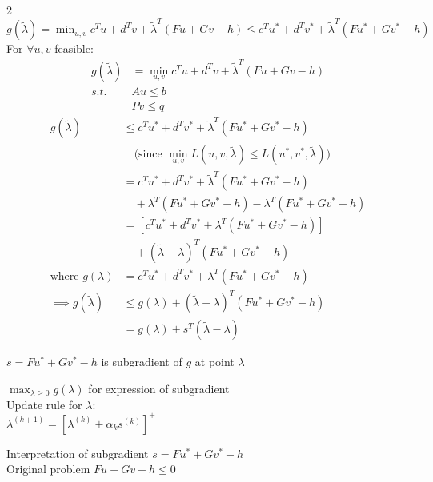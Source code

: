 \documentclass[8pt]{extarticle}
\begin{document}
\begin{multicols*}{2}
  $g(\tilde{\lambda}) = \min_{u,v} c^Tu + d^Tv + \tilde{\lambda}^T(Fu+Gv-h) \leq c^Tu^* + d^Tv^*+\tilde{\lambda}^T(Fu^*+Gv^*-h)$\\

  For $\forall u,v$ feasible:
  \begin{align*}
    g(\tilde{\lambda}) & = \min_{u,v} c^Tu + d^Tv + \tilde{\lambda}^T(Fu+Gv-h)\\
    s.t. & Au \leq b\\
         & Pv \leq q
  \end{align*}
  \begin{align*}
    g(\tilde{\lambda}) & \leq c^Tu^* + d^Tv^* + \tilde{\lambda}^T(Fu^*+Gv^*-h)\\
                       & \quad \text{(since } \min_{u,v} L(u,v,\tilde{\lambda}) \leq L(u^*,v^*,\tilde{\lambda})\text{)}\\
                       & = c^Tu^* + d^Tv^* + \tilde{\lambda}^T(Fu^*+Gv^*-h)\\
                       & \quad +\lambda^T(Fu^*+Gv^*-h) - \lambda^T(Fu^*+Gv^*-h)\\
                       & = [c^Tu^*+d^Tv^* + \lambda^T(Fu^*+Gv^*-h)]\\
                       & \quad + (\tilde{\lambda}-\lambda)^T(Fu^*+Gv^*-h)\\
    \text{where } g(\lambda) & = c^Tu^*+d^Tv^* + \lambda^T(Fu^*+Gv^*-h)\\
    \implies g(\tilde{\lambda}) &\leq g(\lambda) + (\tilde{\lambda}-\lambda)^T(Fu^*+Gv^*-h)\\
                       &= g(\lambda) + s^T(\tilde{\lambda}-\lambda)
  \end{align*}

  $s=Fu^*+Gv^*-h$ is subgradient of $g$ at point $\lambda$

  $\max_{\lambda \geq 0} g(\lambda)$ for expression of subgradient\\

  Update rule for $\lambda$:\\
  $\lambda^{(k+1)}=[\lambda^{(k)} + \alpha_k s^{(k)}]^+$

  Interpretation of subgradient $s=Fu^*+Gv^*-h$\\

  Original problem $Fu+Gv-h \leq 0$\\


\end{multicols*}
\end{document}
